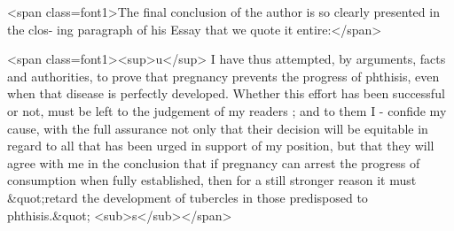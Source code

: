 <span class=font1>The final conclusion of the author is so clearly presented in the clos-
ing paragraph of his Essay that we quote it entire:</span>

<span class=font1><sup>u</sup> I have thus attempted, by arguments, facts and authorities, to
prove that pregnancy prevents the progress of phthisis, even when that
disease is perfectly developed. Whether this effort has been successful
or not, must be left to the judgement of my readers ; and to them I
- confide my cause, with the full assurance not only that their decision
will be equitable in regard to all that has been urged in support of my
position, but that they will agree with me in the conclusion that if
pregnancy can arrest the progress of consumption when fully established,
then for a still stronger reason it must &quot;retard the development of
tubercles in those predisposed to phthisis.&quot; <sub>s</sub></span>
